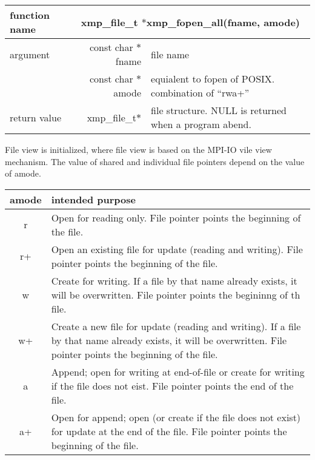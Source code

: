    \begin{table}[h]
    \begin{center}
      \begin{tabular}{|l|r|p{90mm}|}
      \hline
      {\bf function name}  & \multicolumn{2}{c|}{\bf xmp\_file\_t
      $*$xmp\_fopen\_all(fname, amode)}  \\ \hline
      argument & const char $*$fname & file name \\ \cline{2-3}
      & const char $*$amode & equialent to fopen of POSIX. combination
	      of ``rwa+'' \\ \hline
      return value & xmp\_file\_t$*$ & file structure. NULL is returned
	      when a program abend. \\ \hline
      \end{tabular}
     \end{center}
    \label{tb:aaa}
   \end{table}

   File view is initialized, where file view is based on the MPI-IO vile view mechanism. The value of shared and individual file pointers 
   depend on the value of amode.

   \clearpage

   \begin{table}
     \begin{center}
    \label{tb:xxx}
    \begin{tabular}{|c|p{120mm}|}
      \hline
     amode & intended purpose \\ \hline \hline
     r &  Open for reading only. File pointer points the beginning of
	 the file.\\ \hline
     r+ & Open an existing file for update (reading and writing). File
	 pointer points the beginning of the file. \\ \hline
     w &  Create for writing. If a file by that name already exists, it
	 will be overwritten. File pointer points the begininng of th file. \\ \hline
     w+ & Create a new file for update (reading and writing). If a file
	 by that name already exists, it will be overwritten. File
	 pointer points the beginning of the file. \\ \hline
     a & Append; open for writing at end-of-file or create for writing
	 if the file does not eist. File pointer points the end of the file. \\ \hline
     a+ & Open for append; open (or create if the file does not exist)
	 for update at the end of the file. File pointer points the
	 beginning of the file. \\ \hline
    \end{tabular}
   \end{center}
   \end{table}

